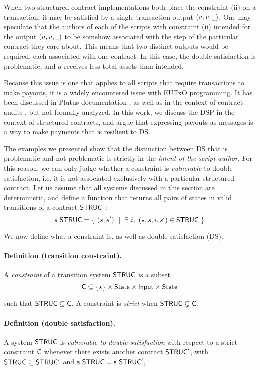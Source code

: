 When two structured contract implementations both place the constraint (ii) on a transaction,
it may be satisfied by a single transaction output $(a, v, \wcard)$. One may
speculate that the authors of each of the
scripts with constraint (ii) intended for the output $(a, v, \wcard)$ to be
somehow associated with the step of the particular contract they care about.
This means that two distinct
outputs would be required, each associated with one contract. In this case,
the double satisfaction is problematic, and $a$ receives less total assets than intended.

Because this issue is one that applies to all scripts
that require transactions to make payouts, it is a widely encountered
issue with EUTxO programming.
It has been discussed in Plutus documentation \cite{plutus-docs}, as well as in the context of
contract audits \cite{marlowe-audit-tech} \cite{ds-blog} \cite{marloweaudit}, but not formally analyzed.
In this work, we discuss the DSP in the context of structured contracts,
and argue that expressing payouts as messages is a way to make
payments that is resilient to DS.

The examples we presented show that the distinction between DS that is problematic
and not problematic is strictly in the \emph{intent of the script author}.
For this reason, we can only judge whether a constraint is \emph{vulnerable}
to double satisfaction, i.e. it is not associated exclusively with a particular
structured contract.
Let us assume that all systems discussed in this section are deterministic,
and define a function that returns all pairs of states in valid transitions
of a contract $\mathsf{STRUC}$ :
\[ \mathsf{s}~\mathsf{STRUC} = \{~ (s, s')~\mid~\exists~i,~(\star, s, i, s') \in \mathsf{STRUC}~\} \]

We now define what a constraint is, as well as double satisfaction (DS).

\paragraph{Definition (transition constraint). }
A \emph{constraint} of a transition system $\mathsf{STRUC}$ is a subset
\[ \mathsf{C} \subseteq \{\star\} \times \mathsf{State} \times \textsf{Input} \times \mathsf{State} \]

such that $\mathsf{STRUC} \subseteq \mathsf{C}$. A constraint is \emph{strict} when
$\mathsf{STRUC} \subsetneq \mathsf{C}$.

\paragraph{Definition (double satisfaction). }
\label{def:ds}
A system $\mathsf{STRUC}$ is \emph{vulnerable to double satisfaction}
with respect to a strict constraint $\mathsf{C}$
whenever there exists another contract $\mathsf{STRUC}'$, with $\mathsf{STRUC} \subseteq \mathsf{STRUC}'$
and $\mathsf{s}~\mathsf{STRUC} = \mathsf{s}~\mathsf{STRUC}'$,

